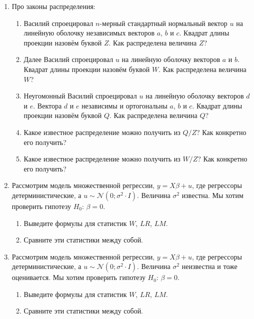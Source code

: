 \documentclass[12pt]{article} %
\theoremstyle{definition} %
\def \cN{\mathcal{N}}
\begin{document}
\begin{enumerate}

\item Про законы распределения:

\begin{enumerate}
  \item Василий спроецировал $n$-мерный стандартный нормальный вектор $u$
  на линейную оболочку независимых векторов $a$, $b$ и $c$. Квадрат длины проекции назовём буквой $Z$. Как распределена величина $Z$?
  \item Далее Василий спроецировал $u$ на линейную оболочку векторов $a$ и $b$. Квадрат длины проекции назовём буквой $W$. Как распределена величина $W$?
  \item Неугомонный Василий спроецировал $u$ на линейную оболочку векторов $d$ и $e$. Вектора $d$ и $e$ независимы и ортогональны $a$, $b$ и $c$.
Квадрат длины проекции назовём буквой $Q$. Как распределена величина $Q$?
\item Какое известное распределение можно получить из $Q/Z$? Как конкретно его получить?
\item Какое известное распределение можно получить из $W/Z$? Как конкретно его получить?
\end{enumerate}


\item Рассмотрим модель множественной регрессии, $y=X\beta + u$, где регрессоры детерминистические, а $u \sim \cN(0; \sigma^2 \cdot I)$.
Величина $\sigma^2$ известна. Мы хотим проверить гипотезу $H_0$: $\beta = 0$.


\begin{enumerate}
\item Выведите формулы для статистик $W$, $LR$, $LM$.
\item Сравните эти статистики между собой.
\end{enumerate}



  \item Рассмотрим модель множественной регрессии, $y=X\beta + u$, где регрессоры детерминистические, а $u \sim \cN(0; \sigma^2 \cdot I)$.
  Величина $\sigma^2$ неизвестна и тоже оценивается.
  Мы хотим проверить гипотезу $H_0$: $\beta = 0$.

  \begin{enumerate}
    \item Выведите формулы для статистик $W$, $LR$, $LM$.
    \item Сравните эти статистики между собой.
  \end{enumerate}


\end{enumerate}
\end{document}
